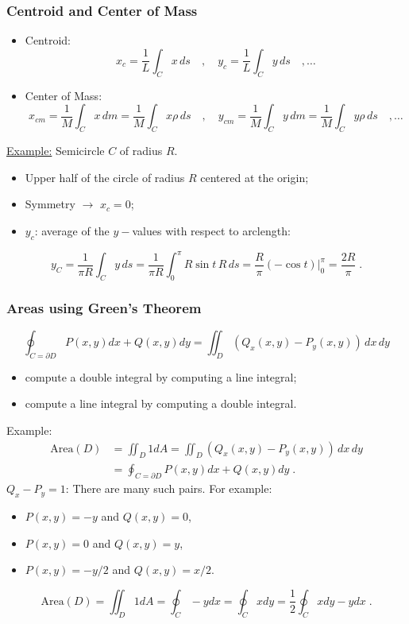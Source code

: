 \begin{frame}
  \frametitle{Centroid and Center of Mass}

\begin{itemize}
\item Centroid:
	$$x_c = \frac{1}{L} \int_C x\, ds \quad , \quad  y_c = \frac{1}{L} \int_C y\, ds \quad ,  \ldots $$
	
	\item Center of Mass:
	$$x_{cm} = \frac{1}{M} \int_C x\, dm = \frac{1}{M} \int_C x \rho\, ds\quad , \quad  y_{cm}= \frac{1}{M} \int_C y\, dm = \frac{1}{M} \int_C y \rho\, ds\quad , \ldots $$
	\end{itemize}

  \underline{Example:} Semicircle $C$ of radius $R$.
  \pause
  \begin{itemize}
  \item Upper half of the circle of radius $R$ centered at the origin;
  \item Symmetry $\to$ $x_c = 0$;
  \item $y_c$: average of the $y-$values with respect to arclength:
  \end{itemize}
%
$$y_C = \frac{1}{\pi R} \int_C y\, ds = \frac{1}{\pi R}\int_{0}^{\pi} R\sin{t}\, R\, ds = \frac{R}{\pi} \left. (-\cos{t})\right|_0^\pi = \frac{2R}{\pi} \; .$$
\end{frame}

\begin{frame}
  \frametitle{Areas using Green's Theorem}

  $$\oint_{C=\partial D} P(x,y) dx + Q(x,y) dy = \iint_D (Q_x(x,y) - P_y(x,y)) \, dx\, dy$$
  
\begin{itemize}
  \item compute a double integral by computing a line integral;
  \item compute a line integral by computing a double integral.
\end{itemize}

Example:
%
\begin{align*}
\text{Area}(D) & = \iint_D 1 dA = \iint_D (Q_x(x,y) - P_y(x,y)) \, dx\, dy \\
& = \oint_{C=\partial D} P(x,y) dx + Q(x,y) dy\; .
\end{align*}
%
$Q_x - P_y = 1$: There are many such pairs. For example:
%
\begin{itemize}
  \item $P(x,y) = -y$ and $Q(x,y) = 0$,
  \item $P(x,y) = 0$ and $Q(x,y) = y$,
  \item $P(x,y) = -y/2$ and $Q(x,y) = x/2$.
\end{itemize}
%
$$\text{Area}(D) = \iint_D 1 dA = \oint_C -ydx = \oint_C xdy = \frac{1}{2}\oint_C xdy-ydx\; .$$
\end{frame}

